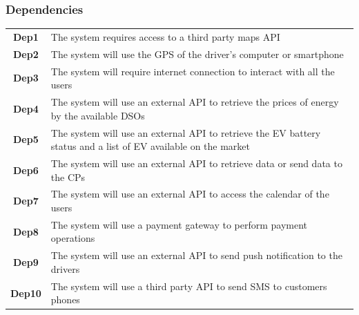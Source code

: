 \subsubsection{Dependencies}
\begin{table}[H]
      \begin{tabularx}{\textwidth}{cX}
            \toprule
            \textbf{Dep1}  & The system requires access to a third party maps API                                                           \\
            \textbf{Dep2}  & The system will use the GPS of the driver's computer or smartphone                                             \\
            \textbf{Dep3}  & The system will require internet connection to interact with all the users                                     \\
            \textbf{Dep4}  & The system will use an external API to retrieve the prices of energy by the available DSOs                     \\
            \textbf{Dep5}  & The system will use an external API to retrieve the EV battery status and a list of EV available on the market \\
            \textbf{Dep6}  & The system will use an external API to retrieve data or send data to the CPs                                   \\
            \textbf{Dep7}  & The system will use an external API to access the calendar of the users                                        \\
            \textbf{Dep8}  & The system will use a payment gateway to perform payment operations                                            \\
            \textbf{Dep9}  & The system will use an external API to send push notification to the drivers                                   \\
            \textbf{Dep10} & The system will use a third party API to send SMS to customers phones                                          \\
            \bottomrule
      \end{tabularx}
\end{table}
